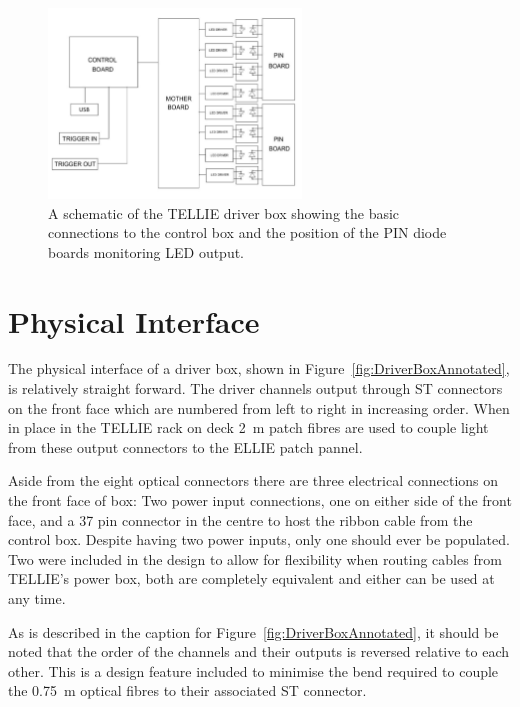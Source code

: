 \documentclass[12pt]{report}
\begin{document}
\begin{figure}[htbp]
	\begin{center}
		\includegraphics[width=0.6\textwidth]{DriverBoxSchematic}
		\caption{A schematic of the TELLIE driver box showing the basic connections to the control box and the position of the PIN diode boards monitoring LED output.}
		\label{fig:DriverBoxSchematic}
	\end{center}
\end{figure}

\section{Physical Interface}
\label{sec:DriverInterface}
The physical interface of a driver box, shown in Figure~\ref{fig:DriverBoxAnnotated}, is relatively straight forward. The driver channels output through ST connectors on the front face which are numbered from left to right in increasing order. When in place in the TELLIE rack on deck 2~m patch fibres are used to couple light from these output connectors to the ELLIE patch pannel. 

Aside from the eight optical connectors there are three electrical connections on the front face of box: Two power input connections, one on either side of the front face, and a 37 pin connector in the centre to host the ribbon cable from the control box. Despite having two power inputs, only one should ever be populated. Two were included in the design to allow for flexibility when routing cables from TELLIE's power box, both are completely equivalent and either can be used at any time. 

As is described in the caption for Figure~\ref{fig:DriverBoxAnnotated}, it should be noted that the order of the channels and their outputs is reversed relative to each other. This is a design feature included to minimise the bend required to couple the 0.75~m optical fibres to their associated ST connector.
\end{document}
